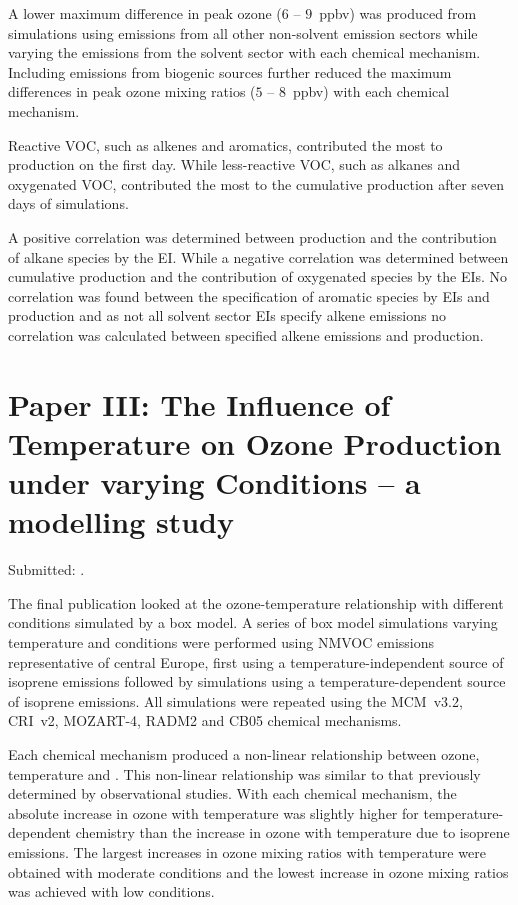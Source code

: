 A lower maximum difference in peak ozone ($6$ -- $9$~ppbv) was produced from simulations using emissions from all other non-solvent emission sectors while varying the emissions from the solvent sector with each chemical mechanism.
Including emissions from biogenic sources further reduced the maximum differences in peak ozone mixing ratios ($5$ -- $8$~ppbv) with each chemical mechanism.

Reactive VOC, such as alkenes and aromatics, contributed the most to  production on the first day.
While less-reactive VOC, such as alkanes and oxygenated VOC, contributed the most to the cumulative  production after seven days of simulations. 

A positive correlation was determined between  production and the contribution of alkane species by the EI.
While a negative correlation was determined between cumulative  production and the contribution of oxygenated species by the EIs.
No correlation was found between the specification of aromatic species by EIs and  production and as not all solvent sector EIs specify alkene emissions no correlation was calculated between specified alkene emissions and  production.

\singlespacing
\section[Paper III]{Paper III: The Influence of Temperature on Ozone Production under varying  Conditions -- a modelling study} \label{s:T-O3_results}

\onehalfspacing

\noindent
Submitted: .

The final publication looked at the ozone-temperature relationship with different  conditions simulated by a box model.
A series of box model simulations varying temperature and  conditions were performed using NMVOC emissions representative of central Europe, first using a temperature-independent source of isoprene emissions followed by simulations using a temperature-dependent source of isoprene emissions.
All simulations were repeated using the MCM~v3.2, CRI~v2, MOZART-4, RADM2 and CB05 chemical mechanisms.

Each chemical mechanism produced a non-linear relationship between ozone, temperature and .
This non-linear relationship was similar to that previously determined by observational studies.  
With each chemical mechanism, the absolute increase in ozone with temperature was slightly higher for temperature-dependent chemistry than the increase in ozone with temperature due to isoprene emissions.
The largest increases in ozone mixing ratios with temperature were obtained with moderate  conditions and the lowest increase in ozone mixing ratios was achieved with low  conditions.

